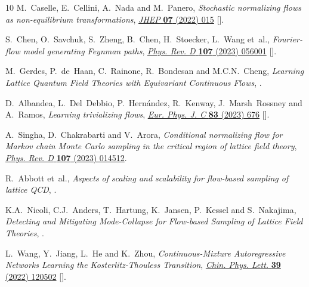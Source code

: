 \begin{thebibliography}{10}
M.~Caselle, E.~Cellini, A.~Nada and M.~Panero, \emph{Stochastic normalizing
  flows as non-equilibrium transformations},
  \href{https://doi.org/10.1007/JHEP07(2022)015}{\emph{JHEP} {\bfseries 07}
  (2022) 015} [\href{https://arxiv.org/abs/2201.08862}{{}}].

S.~Chen, O.~Savchuk, S.~Zheng, B.~Chen, H.~Stoecker, L.~Wang et~al.,
  \emph{{Fourier-flow model generating Feynman paths}},
  \href{https://doi.org/10.1103/PhysRevD.107.056001}{\emph{Phys. Rev. D}
  {\bfseries 107} (2023) 056001}
  [\href{https://arxiv.org/abs/2211.03470}{{}}].

M.~Gerdes, P.~de~Haan, C.~Rainone, R.~Bondesan and M.C.N.~Cheng,
  \emph{{Learning Lattice Quantum Field Theories with Equivariant Continuous
  Flows}},  \href{https://arxiv.org/abs/2207.00283}{{}}.

D.~Albandea, L.~Del~Debbio, P.~Hern\'andez, R.~Kenway, J.~Marsh~Rossney and
  A.~Ramos, \emph{{Learning trivializing flows}},
  \href{https://doi.org/10.1140/epjc/s10052-023-11838-8}{\emph{Eur. Phys. J. C}
  {\bfseries 83} (2023) 676}
  [\href{https://arxiv.org/abs/2302.08408}{{}}].

A.~Singha, D.~Chakrabarti and V.~Arora, \emph{Conditional normalizing flow for
  {{Markov}} chain {{Monte Carlo}} sampling in the critical region of lattice
  field theory}, \href{https://doi.org/10.1103/PhysRevD.107.014512}{\emph{Phys.
  Rev. D} {\bfseries 107} (2023) 014512}.

R.~Abbott et~al., \emph{{Aspects of scaling and scalability for flow-based
  sampling of lattice QCD}},
  \href{https://arxiv.org/abs/2211.07541}{{}}.

K.A.~Nicoli, C.J.~Anders, T.~Hartung, K.~Jansen, P.~Kessel and S.~Nakajima,
  \emph{{Detecting and Mitigating Mode-Collapse for Flow-based Sampling of
  Lattice Field Theories}},  \href{https://arxiv.org/abs/2302.14082}{{}}.

L.~Wang, Y.~Jiang, L.~He and K.~Zhou, \emph{{Continuous-Mixture Autoregressive
  Networks Learning the Kosterlitz-Thouless Transition}},
  \href{https://doi.org/10.1088/0256-307X/39/12/120502}{\emph{Chin. Phys.
  Lett.} {\bfseries 39} (2022) 120502}
  [\href{https://arxiv.org/abs/2005.04857}{{}}].


\end{thebibliography}
